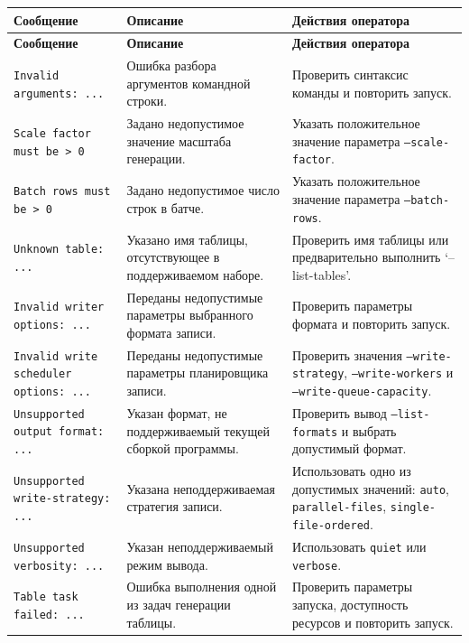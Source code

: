 \begin{longtable}{|p{}|p{}|p{}|}
\hline
\textbf{Сообщение} & \textbf{Описание} & \textbf{Действия оператора} \\
\hline
\endfirsthead
\hline
\textbf{Сообщение} & \textbf{Описание} & \textbf{Действия оператора} \\
\hline
\endhead
\texttt{Invalid arguments: ...} &
Ошибка разбора аргументов командной строки. &
Проверить синтаксис команды и повторить запуск. \\
\hline
\texttt{Scale factor must be > 0} &
Задано недопустимое значение масштаба генерации. &
Указать положительное значение параметра \texttt{--scale-factor}. \\
\hline
\texttt{Batch rows must be > 0} &
Задано недопустимое число строк в батче. &
Указать положительное значение параметра \texttt{--batch-rows}. \\
\hline
\texttt{Unknown table: ...} &
Указано имя таблицы, отсутствующее в поддерживаемом наборе. &
Проверить имя таблицы или предварительно выполнить `--list-tables'. \\
\hline
\texttt{Invalid writer options: ...} &
Переданы недопустимые параметры выбранного формата записи. &
Проверить параметры формата и повторить запуск. \\
\hline
\texttt{Invalid write scheduler options: ...} &
Переданы недопустимые параметры планировщика записи. &
Проверить значения \texttt{--write-strategy}, \texttt{--write-workers} и
\texttt{--write-queue-capacity}. \\
\hline
\texttt{Unsupported output format: ...} &
Указан формат, не поддерживаемый текущей сборкой программы. &
Проверить вывод \texttt{--list-formats} и выбрать допустимый формат. \\
\hline
\texttt{Unsupported write-strategy: ...} &
Указана неподдерживаемая стратегия записи. &
Использовать одно из допустимых значений: \texttt{auto},
\texttt{parallel-files}, \texttt{single-file-ordered}. \\
\hline
\texttt{Unsupported verbosity: ...} &
Указан неподдерживаемый режим вывода. &
Использовать \texttt{quiet} или \texttt{verbose}. \\
\hline
\texttt{Table task failed: ...} &
Ошибка выполнения одной из задач генерации таблицы. &
Проверить параметры запуска, доступность ресурсов и повторить запуск. \\
\hline
\end{longtable}
